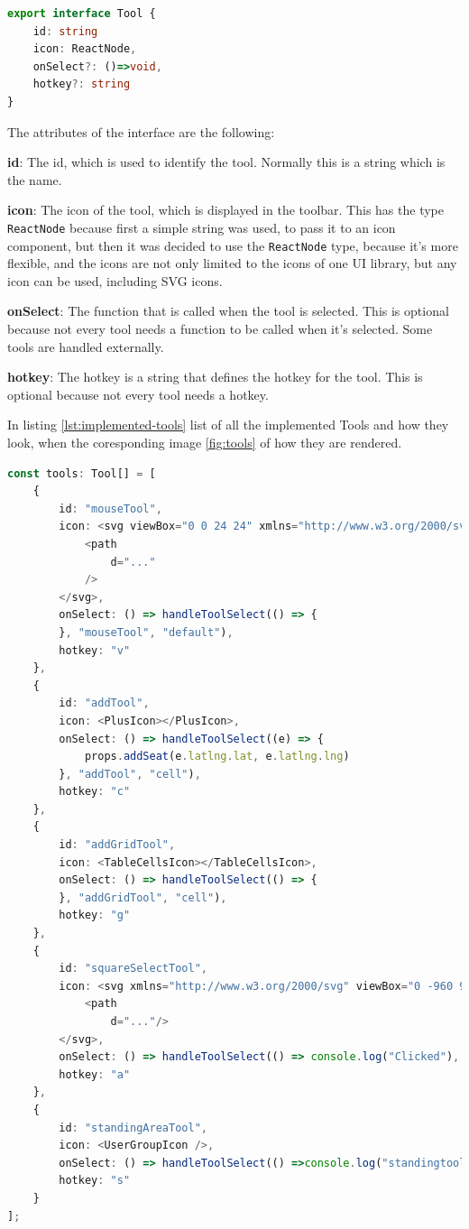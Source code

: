 \begin{lstlisting}[language=TypeScript,caption={Tool interface},label={lst:tool-interface}]
export interface Tool {
    id: string
    icon: ReactNode,
    onSelect?: ()=>void,
    hotkey?: string
}
\end{lstlisting}

The attributes of the interface are the following:
\begin{compactitem}
\item \textbf{id}: The id, which is used to identify the tool. Normally this is a string which is the name.
\item \textbf{icon}: The icon of the tool, which is displayed in the toolbar. This has the type \texttt{ReactNode} because first a simple string was used, to pass it to an icon component, but then it was decided to use the \texttt{ReactNode} type, because it's more flexible, and the icons are not only limited to the icons of one UI library, but any icon can be used, including SVG icons.
\item \textbf{onSelect}: The function that is called when the tool is selected. This is optional because not every tool needs a function to be called when it's selected. Some tools are handled externally.
\item \textbf{hotkey}: The hotkey is a string that defines the hotkey for the tool. This is optional because not every tool needs a hotkey.
\end{compactitem}

In listing \ref{lst:implemented-tools} list of all the implemented Tools and how they look, when the coresponding image \ref{fig:tools} of how they are rendered.

\begin{lstlisting}[language=TypeScript,caption={Implemented Tools},label={lst:implemented-tools}]
const tools: Tool[] = [
    {
        id: "mouseTool",
        icon: <svg viewBox="0 0 24 24" xmlns="http://www.w3.org/2000/svg">
            <path
                d="..."
            />
        </svg>,
        onSelect: () => handleToolSelect(() => {
        }, "mouseTool", "default"),
        hotkey: "v"
    },
    {
        id: "addTool",
        icon: <PlusIcon></PlusIcon>,
        onSelect: () => handleToolSelect((e) => {
            props.addSeat(e.latlng.lat, e.latlng.lng)
        }, "addTool", "cell"),
        hotkey: "c"
    },
    {
        id: "addGridTool",
        icon: <TableCellsIcon></TableCellsIcon>,
        onSelect: () => handleToolSelect(() => {
        }, "addGridTool", "cell"),
        hotkey: "g"
    },
    {
        id: "squareSelectTool",
        icon: <svg xmlns="http://www.w3.org/2000/svg" viewBox="0 -960 960 960">
            <path
                d="..."/>
        </svg>,
        onSelect: () => handleToolSelect(() => console.log("Clicked"), "squareSelectTool", "crosshair"),
        hotkey: "a"
    },
    {
        id: "standingAreaTool",
        icon: <UserGroupIcon />,
        onSelect: () => handleToolSelect(() =>console.log("standingtool"), "standingAreaTool", "crosshair"),
        hotkey: "s"
    }
];
\end{lstlisting}

